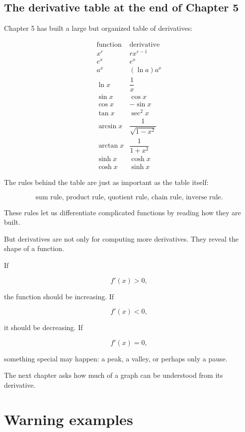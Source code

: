 \subsection{The derivative table at the end of Chapter 5}
\label{subsec:chapter-5-derivative-table-end}

Chapter 5 has built a large but organized table of derivatives:

\[
\boxed{
\begin{array}{c|c}
\text{function} & \text{derivative} \\ \hline
x^r & rx^{r-1} \\[3pt]
e^x & e^x \\[3pt]
a^x & (\ln a)a^x \\[3pt]
\ln x & \dfrac1x \\[8pt]
\sin x & \cos x \\[3pt]
\cos x & -\sin x \\[3pt]
\tan x & \sec^2x \\[3pt]
\arcsin x & \dfrac1{\sqrt{1-x^2}} \\[8pt]
\arctan x & \dfrac1{1+x^2} \\[8pt]
\sinh x & \cosh x \\[3pt]
\cosh x & \sinh x
\end{array}
}
\]

The rules behind the table are just as important as the table itself:

\[
\text{sum rule, product rule, quotient rule, chain rule, inverse rule.}
\]

These rules let us differentiate complicated functions by reading how they are built.

But derivatives are not only for computing more derivatives.  They reveal the shape of a function.

If

\[
f'(x)>0,
\]

the function should be increasing.  If

\[
f'(x)<0,
\]

it should be decreasing.  If

\[
f'(x)=0,
\]

something special may happen: a peak, a valley, or perhaps only a pause.

The next chapter asks how much of a graph can be understood from its derivative.

\section{Warning examples}
\label{sec:warning-examples-differentiation-rules}

